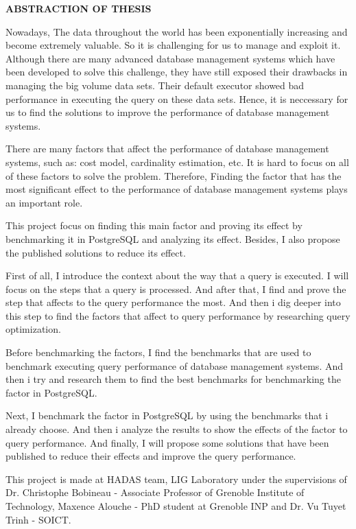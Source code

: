 {\scshape\Large\bfseries\centering ABSTRACTION OF THESIS \par}
\vspace{1cm}
\begin{flushleft}
{\justify
Nowadays, The data throughout the world has been exponentially increasing and become extremely valuable. So it is challenging for us to manage and exploit it. Although there are many advanced database management systems which have been developed to solve this challenge, they have still exposed their drawbacks in managing the  big volume data sets. Their default executor showed bad performance in executing the query on these data sets. Hence, it is neccessary for us to find the solutions to improve the performance of database management systems.  \par}
\vspace{0.5cm}
{\justify
There are many factors that affect the performance of database management systems, such as: cost model, cardinality estimation, etc. It is hard to focus on all of these factors to solve the problem. Therefore, Finding the factor that has the most significant effect to  the performance of database management systems plays an important role.  \par }
\vspace{0.5cm}
{\justify
This project focus on finding this main factor and proving its effect by benchmarking it in PostgreSQL and analyzing its effect. Besides, I also propose the published solutions to reduce its effect.\par}
\vspace{0.5cm}
{\justify
First of all, I introduce the context about the way that a query is executed. I will focus on the steps that a query is processed. And after that, I find and prove the step that affects to the query performance the most. And then i dig deeper into this step to find the factors that affect to query performance by researching query optimization. \par}
\vspace{0.5cm}
{\justify
Before benchmarking the factors, I find the benchmarks that are used to benchmark executing query performance of database management systems. And then i try and research them to find the best benchmarks for benchmarking the factor in PostgreSQL. \par }
\vspace{0.5cm}
{\justify
Next, I benchmark the factor in PostgreSQL by using the benchmarks that i already choose. And then i analyze the results to show the effects of the factor to query performance. And finally, I will propose some solutions that have been published to reduce their effects and improve the query performance. \par }
\vspace{0.5cm}
{\justify
This project is made at HADAS team, LIG Laboratory under the supervisions of Dr. Christophe Bobineau - Associate Professor of Grenoble Institute of Technology, Maxence Alouche - PhD student at Grenoble INP and Dr. Vu Tuyet Trinh - SOICT.
\par}
\end{flushleft}